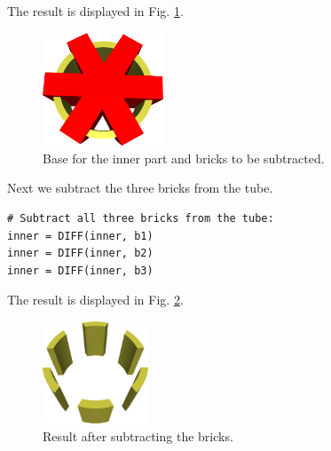 \noindent
The result is displayed in Fig. \ref{fig:gear-8}.

\begin{figure}[!ht]
\begin{center}
\includegraphics[width=0.32\textwidth]{img/gear-8.png}
\end{center}
\vspace{-4mm}
\caption{Base for the inner part and bricks to be subtracted.}
\label{fig:gear-8}
\end{figure}
\noindent
Next we subtract the three bricks from the tube. \\

{\small
\begin{bbox}
\begin{verbatim}
# Subtract all three bricks from the tube:
inner = DIFF(inner, b1)
inner = DIFF(inner, b2)
inner = DIFF(inner, b3)
\end{verbatim}
\end{bbox}
}
\vspace{6mm}

\noindent
The result is displayed in Fig. \ref{fig:gear-9}.\\

\begin{figure}[!ht]
\begin{center}
\includegraphics[width=0.28\textwidth]{img/gear-9.png}
\end{center}
\vspace{-4mm}
\caption{Result after subtracting the bricks.}
\label{fig:gear-9}
\end{figure}

